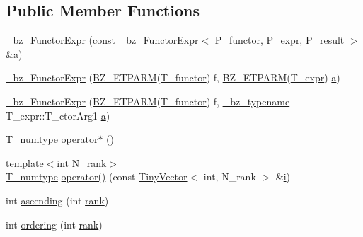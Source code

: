 \subsection*{Public Member Functions}
\begin{DoxyCompactItemize}
\item 
\hyperlink{class__bz__FunctorExpr_a6755ed01556a06a3623d58c0ff6d2386}{\+\_\+bz\+\_\+\+Functor\+Expr} (const \hyperlink{class__bz__FunctorExpr}{\+\_\+bz\+\_\+\+Functor\+Expr}$<$ P\+\_\+functor, P\+\_\+expr, P\+\_\+result $>$ \&\hyperlink{gen__mat5files_8m_aae328bf20413f220e38aec4d95bfd6da}{a})
\item 
\hyperlink{class__bz__FunctorExpr_a6dc6433e9a52d29c70879106d3380242}{\+\_\+bz\+\_\+\+Functor\+Expr} (\hyperlink{tuning_8h_a92a6f3aa8f4cd5ac9b4239c449892bb7}{B\+Z\+\_\+\+E\+T\+P\+A\+R\+M}(\hyperlink{class__bz__FunctorExpr_a6c0ecd2aeb9dea27ad1a9b9cbc6dd869}{T\+\_\+functor}) f, \hyperlink{tuning_8h_a92a6f3aa8f4cd5ac9b4239c449892bb7}{B\+Z\+\_\+\+E\+T\+P\+A\+R\+M}(\hyperlink{class__bz__FunctorExpr_ae52bb9b2640fb1ad5efde18b4369fdea}{T\+\_\+expr}) \hyperlink{gen__mat5files_8m_aae328bf20413f220e38aec4d95bfd6da}{a})
\item 
\hyperlink{class__bz__FunctorExpr_a38c5dfff0c2fc044ac2ae3a02eb8925a}{\+\_\+bz\+\_\+\+Functor\+Expr} (\hyperlink{tuning_8h_a92a6f3aa8f4cd5ac9b4239c449892bb7}{B\+Z\+\_\+\+E\+T\+P\+A\+R\+M}(\hyperlink{class__bz__FunctorExpr_a6c0ecd2aeb9dea27ad1a9b9cbc6dd869}{T\+\_\+functor}) f, \hyperlink{compiler_8h_a1bc40add3e72effc9cf69dbe445cbdfd}{\+\_\+bz\+\_\+typename} T\+\_\+expr\+::\+T\+\_\+ctor\+Arg1 \hyperlink{gen__mat5files_8m_aae328bf20413f220e38aec4d95bfd6da}{a})
\item 
\hyperlink{class__bz__FunctorExpr_a4adadf2cfc27ce07971936d0b3d5ca65}{T\+\_\+numtype} \hyperlink{class__bz__FunctorExpr_a853e7b408efc274beb880dca304a4e70}{operator$\ast$} ()
\item 
{\footnotesize template$<$int N\+\_\+rank$>$ }\\\hyperlink{class__bz__FunctorExpr_a4adadf2cfc27ce07971936d0b3d5ca65}{T\+\_\+numtype} \hyperlink{class__bz__FunctorExpr_a89856efbf1751d458b20219ede49b29c}{operator()} (const \hyperlink{classTinyVector}{Tiny\+Vector}$<$ int, N\+\_\+rank $>$ \&\hyperlink{indexexpr_8h_aabd77643995707c185e95c8cb2782c81}{i})
\item 
int \hyperlink{class__bz__FunctorExpr_a90aec380638b52ed42e93f9c7a8303d6}{ascending} (int \hyperlink{class__bz__FunctorExpr_a34e5b88b9c07345c11118510630102ce}{rank})
\item 
int \hyperlink{class__bz__FunctorExpr_a803d856c844441d26611a817d3746263}{ordering} (int \hyperlink{class__bz__FunctorExpr_a34e5b88b9c07345c11118510630102ce}{rank})

\end{DoxyCompactItemize}
